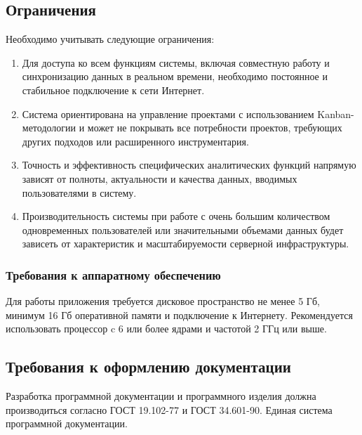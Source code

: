 \subsection{Ограничения}

Необходимо учитывать следующие ограничения:
\begin{enumerate}
	\item Для доступа ко всем функциям системы, включая совместную работу и синхронизацию данных в реальном времени, необходимо постоянное и стабильное подключение к сети Интернет.
	\item Система ориентирована на управление проектами с использованием Kanban-методологии и может не покрывать все потребности проектов, требующих других подходов или расширенного инструментария.
	\item Точность и эффективность специфических аналитических функций напрямую зависят от полноты, актуальности и качества данных, вводимых пользователями в систему.
	\item Производительность системы при работе с очень большим количеством одновременных пользователей или значительными объемами данных будет зависеть от характеристик и масштабируемости серверной инфраструктуры.
\end{enumerate}

\subsubsection{Требования к аппаратному обеспечению}
Для работы приложения требуется дисковое пространство не менее 5 Гб, минимум 16 Гб оперативной памяти и подключение к Интернету. Рекомендуется использовать процессор c 6 или более ядрами и частотой 2 ГГц или выше.

\subsection{Требования к оформлению документации}

Разработка программной документации и программного изделия должна производиться согласно ГОСТ 19.102-77 и ГОСТ 34.601-90. Единая система программной документации.